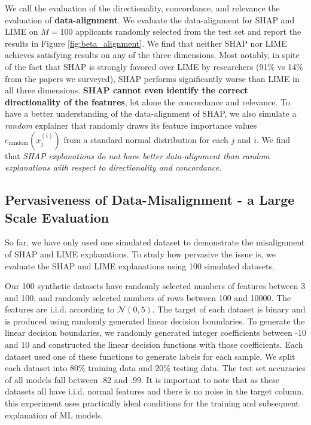 \documentclass[12pt]{article}  %
\begin{document}
  We call the evaluation of the directionality, concordance, and relevance the evaluation of \textbf{data-alignment}. We evaluate the data-alignment
 for SHAP and LIME on $M=100$ applicants randomly selected from the test set and report the results in Figure \ref{fig:beta_alignment}. 
 We find that neither SHAP nor LIME achieves satisfying results on any of the three dimensions. Most notably, in spite of the fact that SHAP is strongly favored over LIME by researchers (91\% vs 14\% from the papers we surveyed), SHAP performs significantly worse than LIME in all three dimensions. \textbf{SHAP cannot even identify the correct directionality of the features}, let alone the concordance and relevance. To have a better understanding of the data-alignment of SHAP, we also simulate a \emph{random} explainer that randomly draws its feature importance values $e_\text{random}(x^{(i)}_j)$ from a standard normal distribution for each $j$ and $i$. We find that \emph{SHAP explanations do not have better data-alignment than random explanations  with respect to directionality and concordance.}         


\subsection{Pervasiveness of Data-Misalignment - a Large Scale Evaluation}
    \label{sec:pervasive}
    So far, we have only used one simulated dataset to demonstrate the misalignment of SHAP and LIME explanations. To study how pervasive the issue is, %
    we evaluate the SHAP and LIME explanations using 100 simulated datasets.
    
    Our 100 synthetic datasets have randomly selected numbers of features between 3 and 100, and randomly selected numbers of rows between 100 and 10000. The features are i.i.d. according to $\mathcal{N}(0,5)$. The target of each dataset is binary and is produced using randomly generated linear decision boundaries. To generate the linear decision boundaries, we randomly generated integer coefficients between -10 and 10 and  constructed the linear decision functions with those coefficients. Each dataset used one of these functions to generate labels for each sample.  %
    We split each dataset into 80\% training data and 20\% testing data.  The test set accuracies of all models fall between $.82$ and $.99$. It is important to note that as these datasets all have i.i.d. normal features and there is no noise in the target column, this experiment uses practically ideal conditions for the training and subsequent explanation of ML models.
\end{document}
